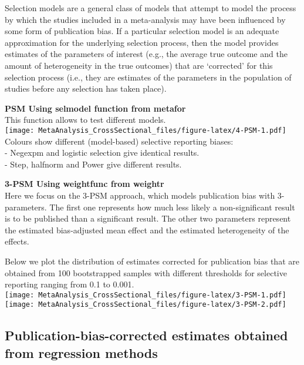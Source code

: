 \documentclass[
]{book}
\begin{document}
Selection models are a general class of models that attempt to model the process by which the studies included in a meta-analysis may have been influenced by some form of publication bias. If a particular selection model is an adequate approximation for the underlying selection process, then the model provides estimates of the parameters of interest (e.g., the average true outcome and the amount of heterogeneity in the true outcomes) that are `corrected' for this selection process (i.e., they are estimates of the parameters in the population of studies before any selection has taken place).

\textbf{PSM Using selmodel function from metafor }\\
This function allows to test different models.\\
\texttt{[image: MetaAnalysis\_CrossSectional\_files/figure-latex/4-PSM-1.pdf]}
Colours show different (model-based) selective reporting biases:\\
- Negexpm and logistic selection give identical results.\\
- Step, halfnorm and Power give different results.

\textbf{3-PSM Using weightfunc from weightr }\\
Here we focus on the 3-PSM approach, which models publication bias with 3-parameters.
The first one represents how much less likely a non-significant result is to be published
than a significant result. The other two parameters represent the estimated bias-adjusted
mean effect and the estimated heterogeneity of the effects.

Below we plot the distribution of estimates corrected for publication bias that are
obtained from 100 bootstrapped samples with different thresholds for selective reporting
ranging from 0.1 to 0.001.\\
\texttt{[image: MetaAnalysis\_CrossSectional\_files/figure-latex/3-PSM-1.pdf]} \texttt{[image: MetaAnalysis\_CrossSectional\_files/figure-latex/3-PSM-2.pdf]}

\hypertarget{publication-bias-corrected-estimates-obtained-from-regression-methods}{%
\subsection{Publication-bias-corrected estimates obtained from regression methods}\label{publication-bias-corrected-estimates-obtained-from-regression-methods}}
\end{document}
